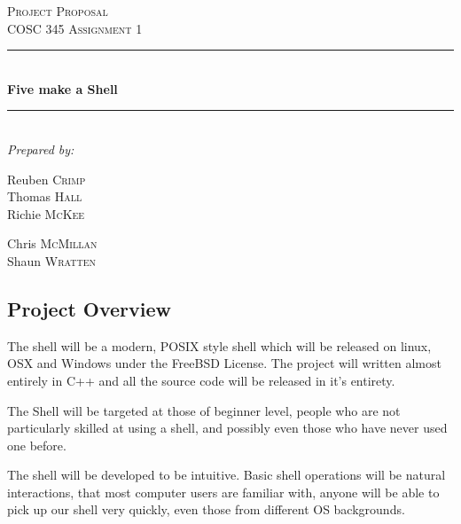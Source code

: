 \documentclass[a4paper,12pt]{article}
\begin{document}
\begin{titlepage}

  \newcommand{\HRule}{\rule{\linewidth}{0.5mm}}
  \begin{center}
    \textsc{\LARGE Project Proposal}\\[0.5cm] 
    \textsc{\large COSC 345 Assignment 1}\\[0.5cm] 

    \HRule \\[0.6cm]
           { \huge \bfseries Five make a Shell}\\[0.4cm]
           \HRule \\[1.5cm]
           
           \Large \emph{Prepared by:}\\
           \begin{multicols}{3}
             Reuben \textsc{Crimp}\\
             Thomas \textsc{Hall}\\
             Richie \textsc{McKee}\\           
           \end{multicols}
           \begin{multicols}{2}
             Chris \textsc{McMillan}\\
             Shaun \textsc{Wratten}\\           
           \end{multicols}

  \end{center}
  \null\vfill{\small %
    \hline
    \begin{center}
        \section*{Project Overview}
    \end{center}
    The shell will be a modern, POSIX style shell which will be released on linux, OSX and Windows under the FreeBSD License. The project will written almost entirely in C++ and all the source code will be released in it's entirety.

    The Shell will be targeted at those of beginner level, people who are not particularly skilled at using a shell, and possibly even those who have never used one before.

    The shell will be developed to be intuitive. Basic shell operations will be natural interactions, that most computer users are familiar with, anyone will be able to pick up our shell very quickly, even those from different OS backgrounds.

}
\end{titlepage}
\end{document}
